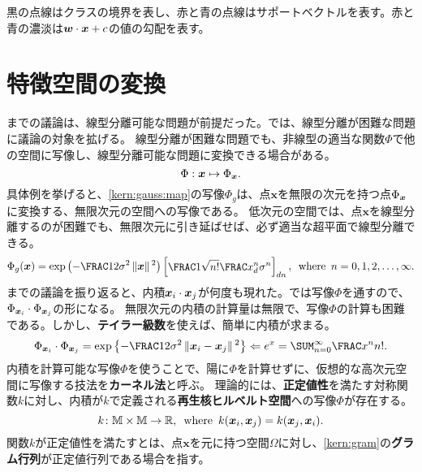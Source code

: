 \documentclass[10pt,a4paper]{book}
\begin{document}
黒の点線はクラスの境界を表し、赤と青の点線はサポートベクトルを表す。赤と青の濃淡は$\bm{w} \cdot \bm{x}+c$の値の勾配を表す。

\section{特徴空間の変換\label{sect:kernel}}

までの議論は、線型分離可能な問題が前提だった。では、線型分離が困難な問題に議論の対象を拡げる。
線型分離が困難な問題でも、非線型の適当な関数$\Phi$で他の空間に写像し、線型分離可能な問題に変換できる場合がある。
%
\begin{equation}
\label{eq:kern:map}
\Phi: \bm{x} \mapsto \Phi_{\bm{x}}.
\end{equation}
%
具体例を挙げると、\eqref{kern:gauss:map}の写像$\Phi_g$は、点$\bm{x}$を無限の次元を持つ点$\Phi_{\bm{x}}$に変換する、無限次元の空間への写像である。
低次元の空間では、点$\bm{x}$を線型分離するのが困難でも、無限次元に引き延ばせば、必ず適当な超平面で線型分離できる。
%
\begin{equation}
\label{eq:kern:gauss:map}
\Phi_g(\bm{x}) = \exp \tup{- \frac{1}{2\sigma^2} \norm{\bm{x}}^2}
\begin{bmatrix}
\frac{1}{\sqrt{n!}} \frac{x_d^n}{\sigma^n}
\end{bmatrix}_{dn},
\where
n = 0,1,2,\ldots,\infty.
\end{equation}
%
までの議論を振り返ると、内積$\bm{x}_i \cdot \bm{x}_j$が何度も現れた。では写像$\Phi$を通すので、$\Phi_{\bm{x}_{i}} \cdot \Phi_{\bm{x}_{j}}$の形になる。
無限次元の内積の計算量は無限で、写像$\Phi$の計算も困難である。しかし、\textbf{テイラー級数}を使えば、簡単に内積が求まる。
%
\begin{equation}
\label{eq:kern:gauss:dot}
\dprod{\Phix{i}}{\Phix{j}} =
\exp \seq{- \frac{1}{2\sigma^2} \norm{\bm{x}_i-\bm{x}_j}^2}
\Leftarrow
e^x = \sum_{n=0}^\infty \frac{x^n}{n!}.
\end{equation}
%
内積を計算可能な写像$\Phi$を使うことで、陽に$\Phi$を計算せずに、仮想的な高次元空間に写像する技法を\textbf{カーネル法}と呼ぶ。
理論的には、\textbf{正定値性}を満たす対称関数$k$に対し、内積が$k$で定義される\textbf{再生核ヒルベルト空間}への写像$\Phi$が存在する。
%
\begin{equation}
\label{eq:kernel}
k \colon \mathbb{M} \times \mathbb{M} \to \mathbb{R},
\enspace\mathrm{where}\enspace
k(\bm{x}_i,\bm{x}_j) = k(\bm{x}_j,\bm{x}_i).
\end{equation}
%
関数$k$が正定値性を満たすとは、点$\bm{x}$を元に持つ空間$\Omega$に対し、\eqref{kern:gram}の\textbf{グラム行列}が正定値行列である場合を指す。
\end{document}
